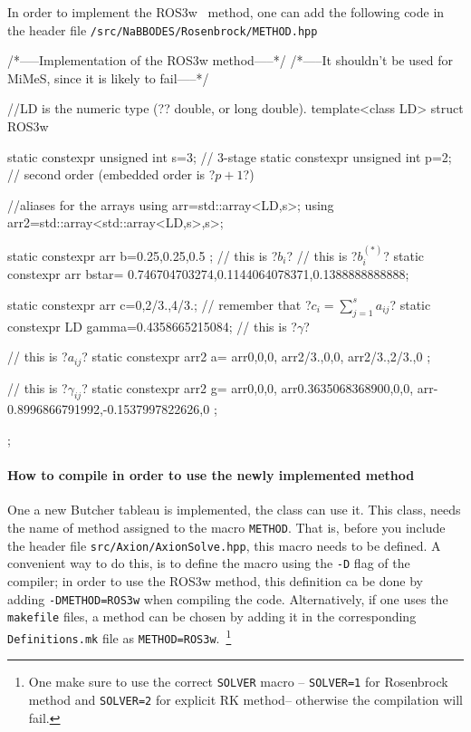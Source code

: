 \documentclass[11pt,a4paper]{article}
\begin{document}
In order to implement the ROS3w~\cite{RangAngermann2005} method, one can add the following code in the header file {\tt \mimes/src/NaBBODES/Rosenbrock/METHOD.hpp}
%
\begin{cpp}
	/*-----Implementation of the ROS3w method-----*/
	/*-----It shouldn't be used for MiMeS, since it is likely to fail-----*/
	
	
	//LD is the numeric type (?\ie? double, or long double).
	template<class LD>
	struct ROS3w{
		static constexpr unsigned int s=3; // 3-stage
		static constexpr unsigned int p=2; // second order (embedded order is ?$p+1$?)
		
		//aliases for the arrays
		using arr=std::array<LD,s>;
		using arr2=std::array<std::array<LD,s>,s>;

		static constexpr arr b={0.25,0.25,0.5 };  // this is ?$b_i$?
		// this is ?$b_i^{(*)}$?
		static constexpr arr bstar={ 0.746704703274,0.1144064078371,0.1388888888888};  
		
		static constexpr arr c={0,2/3.,4/3.}; // remember that ?$c_i = \displaystyle\sum_{j=1}^{s} a_{ij}$?
		static constexpr LD gamma=0.4358665215084; // this is ?$\gamma$?
		
		// this is ?$a_{ij}$?
		static constexpr arr2 a={
			arr{0,0,0},
			arr{2/3.,0,0},
			arr{2/3.,2/3.,0}	
		};
	
		// this is ?$\gamma_{ij}$?	
		static constexpr arr2 g={
			arr{0,0,0},
			arr{0.3635068368900,0,0},
			arr{-0.8996866791992,-0.1537997822626,0}
		};
	};
\end{cpp}

\paragraph{How to compile \mimes in order to use the newly implemented method} One a new Butcher tableau is implemented, the  class can use it. This class, needs the name of method assigned to the macro {\tt METHOD}. That is, before you include the header file {\tt src/Axion/AxionSolve.hpp}, this macro needs to be defined. A convenient way to do this, is to define the macro using the {\tt -D} flag of the compiler; \eg in order to use the ROS3w method, this definition ca be done by adding  {\tt -DMETHOD=ROS3w} when compiling the code. Alternatively, if one uses the {\tt makefile} files, a method can be chosen by adding it in the corresponding {\tt Definitions.mk} file as {\tt METHOD=ROS3w}.~\footnote{One make sure to use the correct {\tt SOLVER} macro -- {\tt SOLVER=1} for Rosenbrock method  and {\tt SOLVER=2} for explicit RK method-- otherwise the compilation will fail.} 
\end{document}

